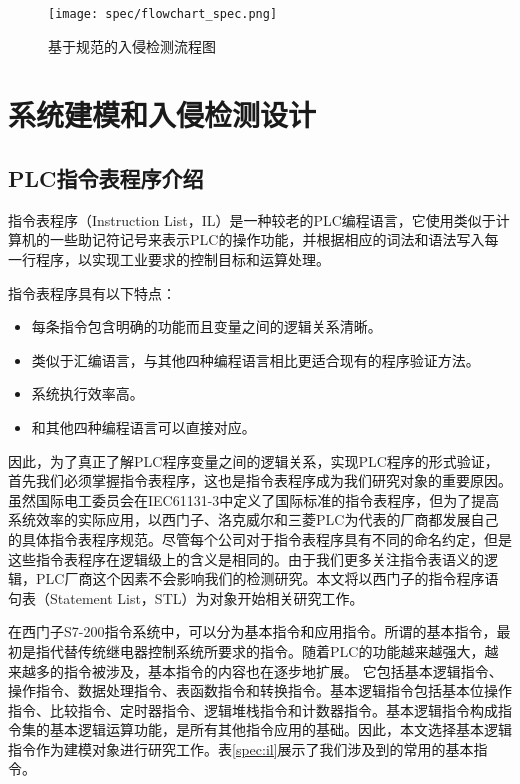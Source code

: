 \begin{figure}[!htb]
\centering
\texttt{[image: spec/flowchart\_spec.png]}
\caption{基于规范的入侵检测流程图}
\label{fig21}
\end{figure}

\section{系统建模和入侵检测设计}
\label{sec:matheq}

\subsection{PLC指令表程序介绍}

指令表程序（Instruction  List，IL）是一种较老的PLC编程语言，它使用类似于计算机的一些助记符记号来表示PLC的操作功能，并根据相应的词法和语法写入每一行程序，以实现工业要求的控制目标和运算处理。

指令表程序具有以下特点：

\begin{itemize}
	\item 每条指令包含明确的功能而且变量之间的逻辑关系清晰。 
	\item 类似于汇编语言，与其他四种编程语言相比更适合现有的程序验证方法。 
	\item 系统执行效率高。
	\item 和其他四种编程语言可以直接对应。
\end{itemize}

因此，为了真正了解PLC程序变量之间的逻辑关系，实现PLC程序的形式验证，首先我们必须掌握指令表程序，这也是指令表程序成为我们研究对象的重要原因。虽然国际电工委员会在IEC61131-3中定义了国际标准的指令表程序，但为了提高系统效率的实际应用，以西门子、洛克威尔和三菱PLC为代表的厂商都发展自己的具体指令表程序规范。尽管每个公司对于指令表程序具有不同的命名约定，但是这些指令表程序在逻辑级上的含义是相同的。由于我们更多关注指令表语义的逻辑，PLC厂商这个因素不会影响我们的检测研究。本文将以西门子的指令程序语句表（Statement  List，STL）为对象开始相关研究工作。

在西门子S7-200指令系统中，可以分为基本指令和应用指令。所谓的基本指令，最初是指代替传统继电器控制系统所要求的指令。随着PLC的功能越来越强大，越来越多的指令被涉及，基本指令的内容也在逐步地扩展。 它包括基本逻辑指令、操作指令、数据处理指令、表函数指令和转换指令。基本逻辑指令包括基本位操作指令、比较指令、定时器指令、逻辑堆栈指令和计数器指令。基本逻辑指令构成指令集的基本逻辑运算功能，是所有其他指令应用的基础。因此，本文选择基本逻辑指令作为建模对象进行研究工作。表\ref{spec:il}展示了我们涉及到的常用的基本指令。

